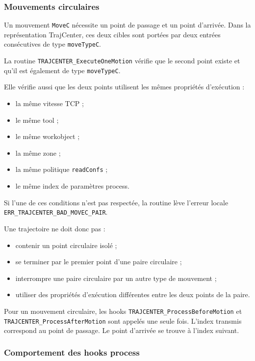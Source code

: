 \documentclass{rapportENSAM}
\begin{document}
\subsubsection{Mouvements circulaires}
\label{subsubsec:rapid-circular-movements}

Un mouvement \texttt{MoveC} nécessite un point de passage et un point
d'arrivée. Dans la représentation TrajCenter, ces deux cibles sont portées par
deux entrées consécutives de type \texttt{moveTypeC}.

La routine \texttt{TRAJCENTER\_ExecuteOneMotion} vérifie que le second point
existe et qu'il est également de type \texttt{moveTypeC}.

Elle vérifie aussi que les deux points utilisent les mêmes propriétés
d'exécution :

\begin{itemize}
    \item la même vitesse TCP ;
    \item le même tool ;
    \item le même workobject ;
    \item la même zone ;
    \item la même politique \texttt{readConfs} ;
    \item le même index de paramètres process.
\end{itemize}

Si l'une de ces conditions n'est pas respectée, la routine lève l'erreur
locale \texttt{ERR\_TRAJCENTER\_BAD\_MOVEC\_PAIR}.

Une trajectoire ne doit donc pas :

\begin{itemize}
    \item contenir un point circulaire isolé ;
    \item se terminer par le premier point d'une paire circulaire ;
    \item interrompre une paire circulaire par un autre type de mouvement ;
    \item utiliser des propriétés d'exécution différentes entre les deux
    points de la paire.
\end{itemize}

Pour un mouvement circulaire, les hooks
\texttt{TRAJCENTER\_ProcessBeforeMotion} et
\texttt{TRAJCENTER\_ProcessAfterMotion} sont appelés une seule fois. L'index
transmis correspond au point de passage. Le point d'arrivée se trouve à
l'index suivant.


\subsubsection{Comportement des hooks process}
\label{subsubsec:rapid-process-hooks}
\end{document}
